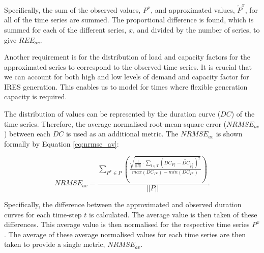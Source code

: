 Specifically, the sum of the observed values, $P^x$, and approximated values, $\widetilde P^x$, for all of the time series are summed. The proportional difference is found, which is summed for each of the different series, $x$, and divided by the number of series, to give $REE_{av}$.







Another requirement is for the distribution of load and capacity factors for the approximated series to correspond to the observed time series. It is crucial that we can account for both high and low levels of demand and capacity factor for IRES generation. This enables us to model for times where flexible generation capacity is required.

The distribution of values can be represented by the duration curve ($DC$) of the time series. Therefore, the average normalised root-mean-square error ($NRMSE_{av}$) between each $DC$ is used as an additional metric. The $NRMSE_{av}$ is shown formally by Equation \ref{eq:nrmse_av}:

\begin{equation}
\label{eq:nrmse_av}
NRMSE_{av}=\frac
{\sum\limits_{P^x{\in} P}\left(\frac
	{\sqrt{
			\frac{1}{\left|\left|T\right|\right|}
			\cdot
			\sum\limits_{t\in T}(DC_{P^x_t}-\widetilde{DC}_{\widetilde{P}^x_t})^2}
	}
	{max(DC_{P^x})-min(DC_{P^x})}
	\right)}
{\left|\left|P\right|\right|}.
\end{equation}

Specifically, the difference between the approximated and observed duration curves for each time-step $t$ is calculated. The average value is then taken of these differences. This average value is then normalised for the respective time series $P^x$. The average of these average normalised values for each time series are then taken to provide a single metric, $NRMSE_{av}$.



